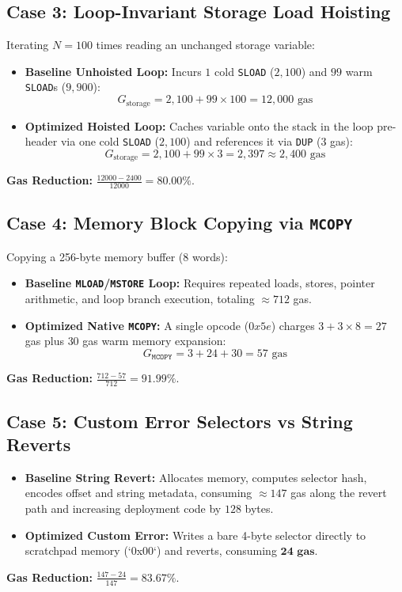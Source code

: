 \documentclass[conference]{IEEEtran}
\begin{document}
\subsection{Case 3: Loop-Invariant Storage Load Hoisting}
Iterating $N = 100$ times reading an unchanged storage variable:
\begin{itemize}
    \item \textbf{Baseline Unhoisted Loop:} Incurs $1$ cold \texttt{SLOAD} ($2,100$) and $99$ warm \texttt{SLOAD}s ($9,900$):
    \begin{equation}
    G_{\text{storage}} = 2,100 + 99 \times 100 = 12,000 \text{ gas}
    \end{equation}
    \item \textbf{Optimized Hoisted Loop:} Caches variable onto the stack in the loop pre-header via one cold \texttt{SLOAD} ($2,100$) and references it via \texttt{DUP} ($3$ gas):
    \begin{equation}
    G_{\text{storage}} = 2,100 + 99 \times 3 = 2,397 \approx 2,400 \text{ gas}
    \end{equation}
\end{itemize}
\textbf{Gas Reduction:} $\frac{12000 - 2400}{12000} = \mathbf{80.00\%}$.

\subsection{Case 4: Memory Block Copying via \texttt{MCOPY}}
Copying a 256-byte memory buffer ($8$ words):
\begin{itemize}
    \item \textbf{Baseline \texttt{MLOAD}/\texttt{MSTORE} Loop:} Requires repeated loads, stores, pointer arithmetic, and loop branch execution, totaling $\approx 712$ gas.
    \item \textbf{Optimized Native \texttt{MCOPY}:} A single opcode ($0x5e$) charges $3 + 3 \times 8 = 27$ gas plus $30$ gas warm memory expansion:
    \begin{equation}
    G_{\texttt{MCOPY}} = 3 + 24 + 30 = 57 \text{ gas}
    \end{equation}
\end{itemize}
\textbf{Gas Reduction:} $\frac{712 - 57}{712} = \mathbf{91.99\%}$.

\subsection{Case 5: Custom Error Selectors vs String Reverts}
\begin{itemize}
    \item \textbf{Baseline String Revert:} Allocates memory, computes selector hash, encodes offset and string metadata, consuming $\approx 147$ gas along the revert path and increasing deployment code by $128$ bytes.
    \item \textbf{Optimized Custom Error:} Writes a bare 4-byte selector directly to scratchpad memory (`0x00`) and reverts, consuming $\mathbf{24 \text{ gas}}$.
\end{itemize}
\textbf{Gas Reduction:} $\frac{147 - 24}{147} = \mathbf{83.67\%}$.
\end{document}

